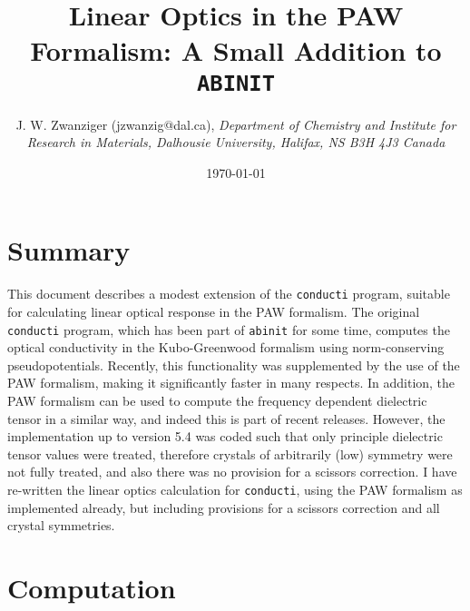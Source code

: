 \documentclass{article}
\begin{document}
\title{Linear Optics in the PAW Formalism: A Small Addition to {\tt ABINIT}}

\author{J. W. Zwanziger (jzwanzig@dal.ca),
{\it Department of Chemistry and Institute for Research in Materials,
Dalhousie University, Halifax, NS B3H 4J3 Canada}}

\date{\today}

\maketitle

\section{Summary}

This document describes a modest extension of the {\tt conducti} program,
suitable for calculating linear optical response in the PAW formalism.
The original {\tt conducti} program, which has been part of {\tt abinit} for
some time, computes the optical conductivity in the Kubo-Greenwood formalism
using norm-conserving pseudopotentials. Recently, this functionality was
supplemented by the use of the PAW formalism, making it significantly
faster in many respects. In addition, the PAW formalism can be used to
compute the frequency dependent dielectric tensor in a similar way, and
indeed this is part of recent releases. However, the implementation up to
version 5.4 was coded such that only principle dielectric tensor values
were treated, therefore crystals of arbitrarily (low) symmetry were not
fully treated, and also there was no provision for a scissors correction. I
have re-written the linear optics calculation for {\tt conducti}, using
the PAW formalism as implemented already, but including provisions for a
scissors correction and all crystal symmetries.

\section{Computation}
\end{document}
